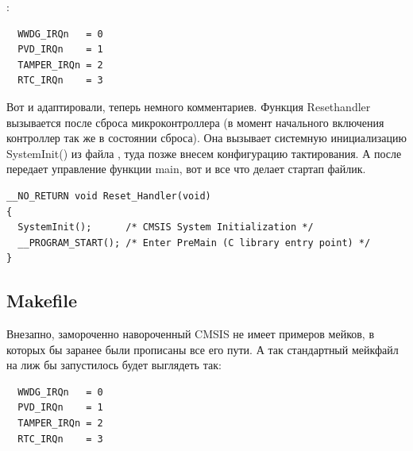 \documentclass[12pt,a4paper]{article}
\begin{document}
:
\begin{lstlisting}
  WWDG_IRQn   = 0
  PVD_IRQn    = 1
  TAMPER_IRQn = 2
  RTC_IRQn    = 3
\end{lstlisting}
    Вот и адаптировали, теперь немного комментариев. Функция Reset\textunderscore handler
    вызывается после сброса микроконтроллера (в момент начального включения
    контроллер так же в состоянии сброса). Она вызывает системную инициализацию
    SystemInit() из файла
    , туда позже внесем конфигурацию тактирования. А после
    передает управление функции main, вот и все что делает стартап файлик.
\begin{lstlisting}
__NO_RETURN void Reset_Handler(void)
{
  SystemInit();      /* CMSIS System Initialization */
  __PROGRAM_START(); /* Enter PreMain (C library entry point) */
}
\end{lstlisting}

\subsection{Makefile}
    Внезапно, замороченно навороченный CMSIS не имеет примеров мейков, в
    которых бы заранее были прописаны все его пути. А так стандартный мейкфайл
    на лиж бы запустилось будет выглядеть так:
\begin{lstlisting}
  WWDG_IRQn   = 0
  PVD_IRQn    = 1
  TAMPER_IRQn = 2
  RTC_IRQn    = 3
\end{lstlisting}
\end{document}
